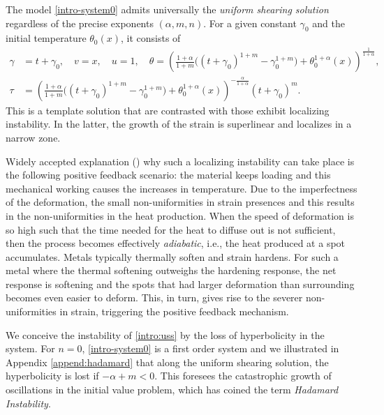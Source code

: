 \documentclass[a4paper,11pt]{article}
\theoremstyle{remark}
\begin{document}
The model \eqref{intro-system0} admits universally the {\it uniform shearing solution} regardless of the precise exponents $(\alpha,m,n)$. For a given constant $\gamma_0$ and the initial temperature $\theta_0(x)$, it consists of
\begin{equation} \label{intro:uss}
 \begin{aligned}
 \gamma &= t+\gamma_0, \quad v=x, \quad u=1, \quad \theta = \left( \frac{1+\alpha}{1+m} \big( (t+\gamma_0)^{1+m}-\gamma_0^{1+m}\big) + \theta_0^{1+\alpha}(x)\right)^{\frac{1}{1+\alpha}}, \\
 \tau&=\left( \frac{1+\alpha}{1+m} \big( (t+\gamma_0)^{1+m}-\gamma_0^{1+m}\big) + \theta_0^{1+\alpha}(x)\right)^{-\frac{\alpha}{1+\alpha}}(t+\gamma_0)^m.
 \end{aligned}
\end{equation}
This is a template solution that are contrasted with those exhibit localizing instability. In the latter, the growth of the strain is superlinear and localizes in a narrow zone.%

Widely accepted explanation (\cite{shawki_shear_1989,clifton_rev_1990}) why such a localizing instability can take place is the following positive feedback scenario: the material keeps loading and
this mechanical working causes the increases in temperature. Due to the imperfectness of the deformation, the small non-uniformities in strain presences and this results in the non-uniformities in the heat production. When the speed of deformation is so high such that the time needed for the heat to diffuse out is not sufficient, then the process becomes effectively {\it adiabatic}, i.e., the heat produced at a spot accumulates. Metals typically thermally soften and strain hardens. For such a metal where the thermal softening outweighs the hardening response, the net response is softening and the spots that had larger deformation than surrounding becomes even easier to deform. This, in turn, gives rise to the severer non-uniformities in strain, triggering the positive feedback mechanism.

We conceive the instability of \eqref{intro:uss} by the loss of hyperbolicity in the system. For $n=0$, \eqref{intro-system0} is a first order system and we illustrated in Appendix \ref{append:hadamard} that along the uniform shearing solution, the hyperbolicity is lost if $-\alpha+m<0$. This foresees the catastrophic growth of oscillations in the initial value problem, which has coined the term {\it Hadamard Instability}.
\end{document}
